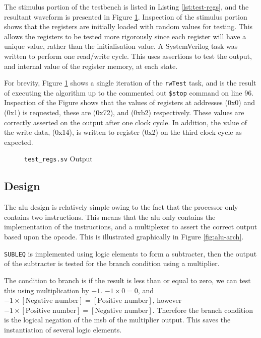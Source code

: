 The stimulus portion of the testbench is listed in Listing \ref{lst:test-regs}, and the resultant waveform is presented in Figure \ref{fig:test-regs}. Inspection of the stimulus portion shows that the registers are initially loaded with random values for testing. This allows the registers to be tested more rigorously since each register will have a unique value, rather than the initialisation value. A SystemVerilog task was written to perform one read/write cycle. This uses assertions to test the output, and internal value of the register memory, at each state.

For brevity, Figure \ref{fig:test-regs} shows a single iteration of the \texttt{rwTest} task, and is the result of executing the algorithm up to the commented out \texttt{\$stop} command on line 96. Inspection of the Figure shows that the values of registers at addresses (0x0) and (0x1) is requested, these are (0x72), and (0xb2) respectively. These values are correctly asserted on the output after one clock cycle. In addition, the value of the write data, (0x14), is written to register (0x2) on the third clock cycle as expected.

\FloatBarrier


\begin{figure}[ht]
	\centering
	
	\caption{\texttt{test\_regs.sv} Output}
	\label{fig:test-regs}
\end{figure}

\subsection{ Design} \label{sec:alu-design}

The \gls{alu} design is relatively simple owing to the fact that the processor only contains two instructions. This means that the \gls{alu} only contains the implementation of the instructions, and a multiplexer to assert the correct output based upon the opcode. This is illustrated graphically in Figure \ref{fig:alu-arch}.

\texttt{SUBLEQ} is implemented using logic elements to form a subtracter, then the output of the subtracter is tested for the branch condition using a multiplier.

The condition to branch is if the result is less than or equal to zero, we can test this using multiplication by $-1$. $-1 \times 0 = 0$, and $-1 \times [\text{Negative number}] = [\text{Positive number}]$, however $-1 \times [\text{Positive number}] = [\text{Negative number}]$. Therefore the branch condition is the logical negation of the \gls{msb} of the multiplier output. This saves the instantiation of several logic elements.

